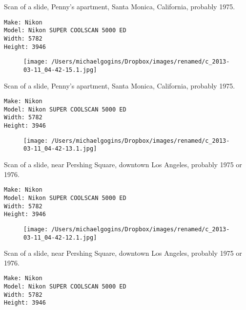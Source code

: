 \documentclass[11pt,letter,DIV=14,paper=landscape]{scrbook}
\begin{document}
\clearpage
\noindent Scan of a slide, Penny's apartment, Santa Monica, California, probably 1975.
\noindent
\begin{lstlisting}
Make: Nikon
Model: Nikon SUPER COOLSCAN 5000 ED
Width: 5782
Height: 3946
\end{lstlisting}
\clearpage

\begin{figure}
\texttt{[image: /Users/michaelgogins/Dropbox/images/renamed/c\_2013-03-11\_04-42-15.1.jpg]}
\end{figure}
    
\clearpage
\noindent Scan of a slide, Penny's apartment, Santa Monica, California, probably 1975.
\noindent
\begin{lstlisting}
Make: Nikon
Model: Nikon SUPER COOLSCAN 5000 ED
Width: 5782
Height: 3946
\end{lstlisting}
\clearpage

\begin{figure}
\texttt{[image: /Users/michaelgogins/Dropbox/images/renamed/c\_2013-03-11\_04-42-13.1.jpg]}
\end{figure}
    
\clearpage
\noindent Scan of a slide, near Pershing Square, downtown Los Angeles, probably 1975 or 1976.
\noindent
\begin{lstlisting}
Make: Nikon
Model: Nikon SUPER COOLSCAN 5000 ED
Width: 5782
Height: 3946
\end{lstlisting}
\clearpage

\begin{figure}
\texttt{[image: /Users/michaelgogins/Dropbox/images/renamed/c\_2013-03-11\_04-42-12.1.jpg]}
\end{figure}
    
\clearpage
\noindent Scan of a slide, near Pershing Square, downtown Los Angeles, probably 1975 or 1976.
\noindent
\begin{lstlisting}
Make: Nikon
Model: Nikon SUPER COOLSCAN 5000 ED
Width: 5782
Height: 3946
\end{lstlisting}
\clearpage
\end{document}
